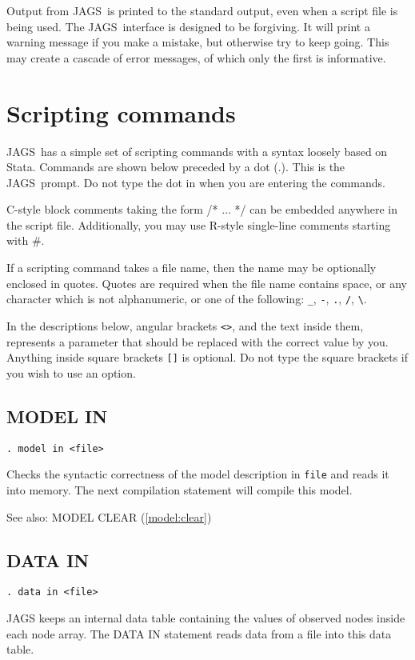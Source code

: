 \documentclass[11pt, a4paper, titlepage]{report}
\newcommand{\JAGS}{\textsf{JAGS}}
\newcommand{\R}{\textsf{R}}
\begin{document}
Output from \JAGS\ is printed to the standard output, even when a
script file is being used.  The \JAGS\ interface is designed to be
forgiving. It will print a warning message if you make a mistake, but
otherwise try to keep going.  This may create a cascade of error messages,
of which only the first is informative.

\section{Scripting commands}
\label{section:scripting}

\JAGS\ has a simple set of scripting commands with a syntax loosely
based on \textsf{Stata}. Commands are shown below preceded by a dot
(.). This is the \JAGS\ prompt. Do not type the dot in when you are
entering the commands.

C-style block comments taking the form /* ... */ can be
embedded anywhere in the script file.  Additionally, you may use
\R-style single-line comments starting with \#.

If a scripting command takes a file name, then the name may be
optionally enclosed in quotes. Quotes are required when the file name
contains space, or any character which is not alphanumeric, or one of
the following: \verb+_+, \verb+-+, \verb+.+, \verb+/+, \verb+\+.

In the descriptions below, angular brackets \verb+<>+, and the text
inside them, represents a parameter that should be replaced with the
correct value by you.  Anything inside square brackets \verb+[]+ is
optional. Do not type the square brackets if you wish to use an
option.

\subsection{MODEL IN}

\begin{verbatim}
. model in <file>
\end{verbatim}
Checks the syntactic correctness of the model description in
\texttt{file} and reads it into memory. The next compilation
statement will compile this model. 

See also: MODEL CLEAR (\ref{model:clear})

\subsection{DATA IN}
\label{data:in}

\begin{verbatim}
. data in <file>
\end{verbatim}
JAGS keeps an internal data table containing the values of observed
nodes inside each node array.  The DATA IN statement reads data from a
file into this data table.
\end{document}
